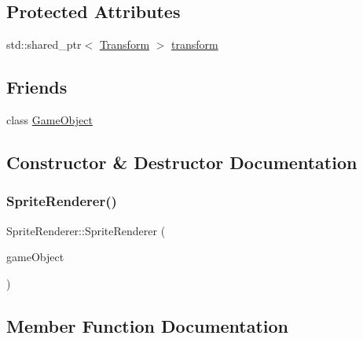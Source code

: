 \subsection*{Protected Attributes}
\begin{DoxyCompactItemize}
\item 
std\+::shared\+\_\+ptr$<$ \hyperlink{class_mason_1_1_transform}{Transform} $>$ \hyperlink{class_mason_1_1_sprite_renderer_a6f117cc02c8fc27dac5692a2127bf329}{transform}
\end{DoxyCompactItemize}
\subsection*{Friends}
\begin{DoxyCompactItemize}
\item 
class \hyperlink{class_mason_1_1_sprite_renderer_a00df87c957d8f7ee0fc51f07a0542f4a}{Game\+Object}
\end{DoxyCompactItemize}


\subsection{Constructor \& Destructor Documentation}
\hypertarget{class_mason_1_1_sprite_renderer_a82f81ad1b56677f6194d91956b213add}{}\label{class_mason_1_1_sprite_renderer_a82f81ad1b56677f6194d91956b213add} 
\subsubsection{\texorpdfstring{Sprite\+Renderer()}{SpriteRenderer()}}
{\footnotesize\ttfamily Sprite\+Renderer\+::\+Sprite\+Renderer (\begin{DoxyParamCaption}\item[{\hyperlink{class_mason_1_1_game_object}{Game\+Object} $\ast$}]{game\+Object }\end{DoxyParamCaption})\hspace{0.3cm}{\ttfamily [protected]}}



\subsection{Member Function Documentation}
\hypertarget{class_mason_1_1_sprite_renderer_aeeeaa7eb5c340b7c2abad3d4785fd1e1}{}\label{class_mason_1_1_sprite_renderer_aeeeaa7eb5c340b7c2abad3d4785fd1e1} 
